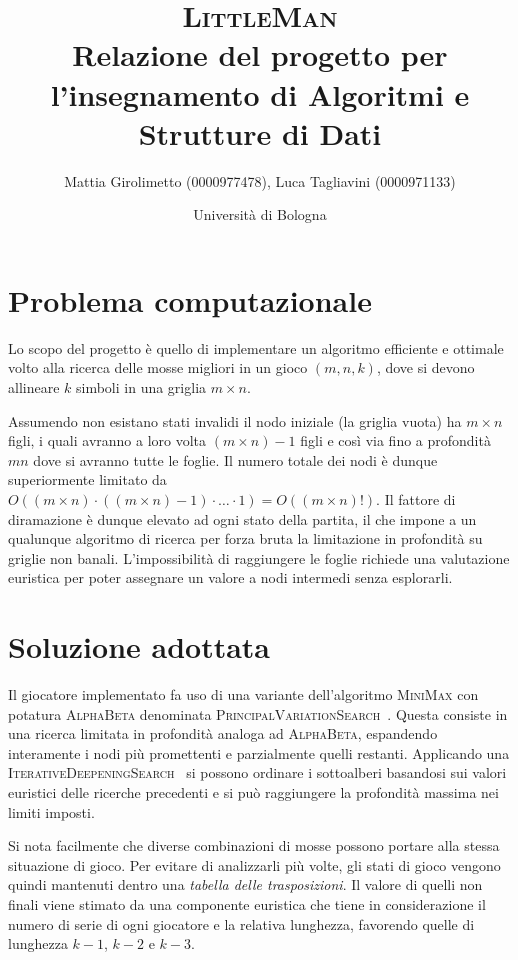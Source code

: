 \documentclass{article}
\title{\textsc{LittleMan}\\
\large Relazione del progetto per l'insegnamento di Algoritmi e Strutture di Dati}
\author{
  Mattia Girolimetto (0000977478),
  Luca Tagliavini (0000971133)
}
\date{
	Universit\`a di Bologna \\
  \displaydate{date}
}
\begin{document}
\maketitle
\pagebreak
\tableofcontents
\pagebreak

\section{Problema computazionale}

Lo scopo del progetto \`e quello di implementare un algoritmo efficiente e ottimale
volto alla ricerca delle mosse migliori in un gioco $(m,n,k)$, dove si devono
allineare $k$ simboli in una griglia $m \times n$.

Assumendo non esistano stati invalidi il nodo iniziale (la griglia vuota)
ha $m \times n$ figli, i quali avranno a loro volta $(m \times n)-1$ figli e cos\`i
via fino a profondit\`a $mn$ dove si avranno tutte le foglie. Il numero totale
dei nodi \`e dunque superiormente limitato da $O((m \times n) \cdot ((m \times n)-1)
\cdot \ldots \cdot 1) = O((m \times n)!)$.
Il fattore di diramazione \`e dunque elevato ad ogni stato della partita, il che
impone a un qualunque algoritmo di ricerca per forza bruta la limitazione in
profondit\`a su griglie non banali. L'impossibilit\`a di raggiungere le foglie
richiede una valutazione euristica per poter assegnare un valore a nodi intermedi
senza esplorarli.

\section{Soluzione adottata}

Il giocatore implementato fa uso di una variante dell'algoritmo \textsc{MiniMax} con potatura
\textsc{AlphaBeta} denominata \textsc{PrincipalVariationSearch}~\cite{negascout}. Questa
consiste in una ricerca limitata in profondit\`a analoga ad \textsc{AlphaBeta}, espandendo 
interamente i nodi pi\`u promettenti e parzialmente quelli restanti. Applicando
una \textsc{IterativeDeepeningSearch}~\cite{id} si possono ordinare i sottoalberi
basandosi sui valori euristici delle ricerche precedenti e si pu\`o raggiungere
la profondit\`a massima nei limiti imposti.

Si nota facilmente che diverse combinazioni di mosse possono portare alla stessa 
situazione di gioco.
Per evitare di analizzarli pi\`u volte, gli stati di gioco vengono quindi mantenuti 
dentro una \emph{tabella delle trasposizioni}. Il valore di quelli non finali
viene stimato da una componente euristica che tiene in considerazione il numero
di serie di ogni giocatore e la relativa lunghezza, favorendo quelle di lunghezza
$k-1$, $k-2$ e $k-3$.
\end{document}

